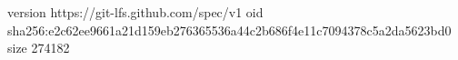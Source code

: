 version https://git-lfs.github.com/spec/v1
oid sha256:e2c62ee9661a21d159eb276365536a44c2b686f4e11c7094378c5a2da5623bd0
size 274182
